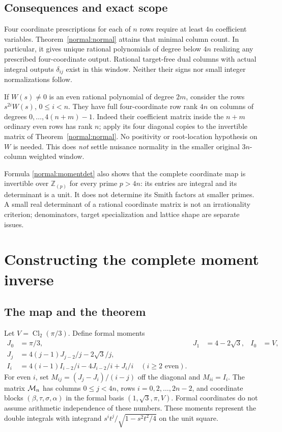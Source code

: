 \documentclass[11pt,a4paper]{article}
\numberwithin{equation}{section}
\theoremstyle{definition}\newtheorem{definition}[theorem]{Definition}
\theoremstyle{remark}\newtheorem{remark}[theorem]{Remark}
\begin{document}
\subsection{Consequences and exact scope}
Four coordinate prescriptions for each of $n$ rows require at least $4n$ coefficient variables. Theorem~\ref{normal:normal} attains that minimal column count. In particular, it gives unique rational polynomials of degree below $4n$ realizing any prescribed four-coordinate output. Rational target-free dual columns with actual integral outputs $\delta_{ij}$ exist in this window. Neither their signs nor small integer normalizations follow.

If $W(s)\ne0$ is an even rational polynomial of degree $2m$, consider the rows $s^{2i}W(s)$, $0\le i<n$. They have full four-coordinate row rank $4n$ on columns of degrees $0,\ldots,4(n+m)-1$. Indeed their coefficient matrix inside the $n+m$ ordinary even rows has rank $n$; apply its four diagonal copies to the invertible matrix of Theorem~\ref{normal:normal}. No positivity or root-location hypothesis on $W$ is needed. This does \emph{not} settle nuisance normality in the smaller original $3n$-column weighted window.

Formula \eqref{normal:momentdet} also shows that the complete coordinate map is invertible over $\mathbb Z_{(p)}$ for every prime $p>4n$: its entries are integral and its determinant is a unit. It does not determine its Smith factors at smaller primes. A small real determinant of a rational coordinate matrix is not an irrationality criterion; denominators, target specialization and lattice shape are separate issues.




\section{Constructing the complete moment inverse}
\subsection{The map and the theorem}
Let $V=\operatorname{Cl}_2(\pi/3)$. Define formal moments
\begin{align*}
 J_0&=\pi/3,&J_1&=4-2\sqrt3,&I_0&=V,\\
 J_j&=4(j-1)J_{j-2}/j-2\sqrt3/j,\\
 I_i&=4(i-1)I_{i-2}/i-4J_{i-2}/i+J_i/i\quad(i\ge2\text{ even}).
\end{align*}
For even $i$, set $M_{ij}=(J_j-J_i)/(i-j)$ off the diagonal and $M_{ii}=I_i$.
The matrix $\mathcal M_n$ has columns $0\le j<4n$, rows $i=0,2,\ldots,2n-2$, and coordinate blocks $(\beta,\tau,\sigma,\alpha)$ in the formal basis $(1,\sqrt3,\pi,V)$. Formal coordinates do not assume arithmetic independence of these numbers. These moments represent the double integrals with integrand $s^it^j/\sqrt{1-s^2t^2/4}$ on the unit square.
\end{document}
